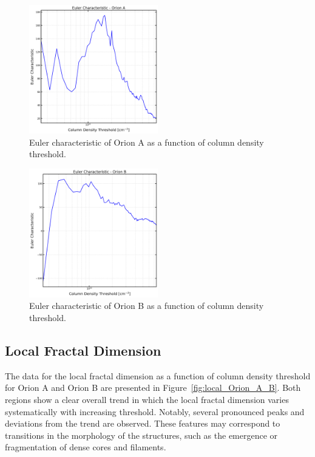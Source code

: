 \begin{figure}[t]
    \centering
    \includegraphics[width=0.5\textwidth]{figures/euler_Orion_A_no_figs.png}
    \caption{Euler characteristic of Orion A as a function of column density threshold.}
    \label{fig:Euler_Orion_A_no_figs}
\end{figure}

\begin{figure}[t]
    \centering
    \includegraphics[width=0.5\textwidth]{figures/euler_Orion_B_no_figs.png}
    \caption{Euler characteristic of Orion B as a function of column density threshold.}
    \label{fig:Euler_Orion_B_no_figs}
\end{figure}

\subsection{Local Fractal Dimension}

The data for the local fractal dimension as a function of column density threshold for Orion A and Orion B are presented in Figure~\ref{fig:local_Orion_A_B}. Both regions show a clear overall trend in which the local fractal dimension varies systematically with increasing threshold. Notably, several pronounced peaks and deviations from the trend are observed. These features may correspond to transitions in the morphology of the structures, such as the emergence or fragmentation of dense cores and filaments.  

